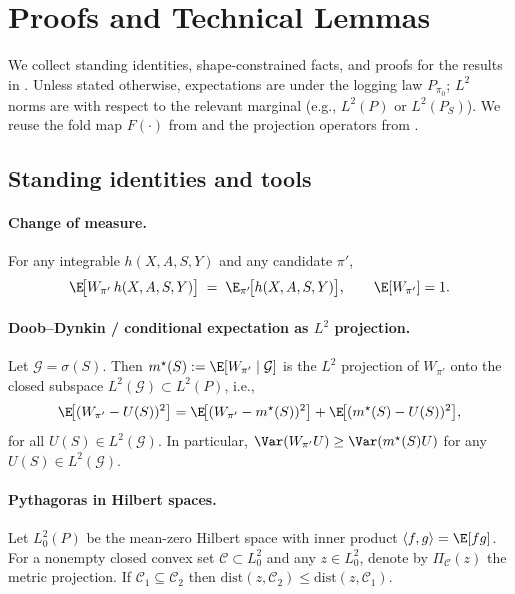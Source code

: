 \section{Proofs and Technical Lemmas}
\label{app:theory}

We collect standing identities, shape-constrained facts, and proofs for the results in . Unless stated otherwise, expectations are under the logging law $P_{\pi_0}$; $L^2$ norms are with respect to the relevant marginal (e.g., $L^2(P)$ or $L^2(P_S)$). We reuse the fold map $F(\cdot)$ from  and the projection operators from .

\subsection{Standing identities and tools}
\label{app:theory-tools}

\paragraph{Change of measure.}
For any integrable $h(X,A,S,Y)$ and any candidate $\pi'$,
\begin{equation}
\E\!\big[ W_{\pi'}\, h(X,A,S,Y)\big] \;=\; \E_{\pi'}\!\big[ h(X,A,S,Y)\big],
\qquad \E[W_{\pi'}]=1.
\label{eq:com}
\end{equation}

\paragraph{Doob--Dynkin / conditional expectation as $L^2$ projection.}
Let $\mathcal{G}=\sigma(S)$. Then $m^\star(S):=\E[W_{\pi'}\mid\mathcal{G}]$ is the $L^2$ projection of $W_{\pi'}$ onto the closed subspace $L^2(\mathcal{G})\subset L^2(P)$, i.e.,
\begin{equation}
\E\!\big[(W_{\pi'}-U(S))^2\big]
=\E\!\big[(W_{\pi'}-m^\star(S))^2\big]+\E\!\big[(m^\star(S)-U(S))^2\big],
\label{eq:orth}
\end{equation}
for all $U(S)\in L^2(\mathcal{G})$. In particular, $\Var(W_{\pi'}U)\ge \Var(m^\star(S)U)$ for any $U(S)\in L^2(\mathcal{G})$.

\paragraph{Pythagoras in Hilbert spaces.}
Let $L^2_0(P)$ be the mean-zero Hilbert space with inner product $\langle f,g\rangle=\E[fg]$. For a nonempty closed convex set $\mathcal{C}\subset L^2_0$ and any $z\in L^2_0$, denote by $\Pi_{\mathcal{C}}(z)$ the metric projection. If $\mathcal{C}_1\subseteq \mathcal{C}_2$ then $\mathrm{dist}(z,\mathcal{C}_2)\le \mathrm{dist}(z,\mathcal{C}_1)$.

